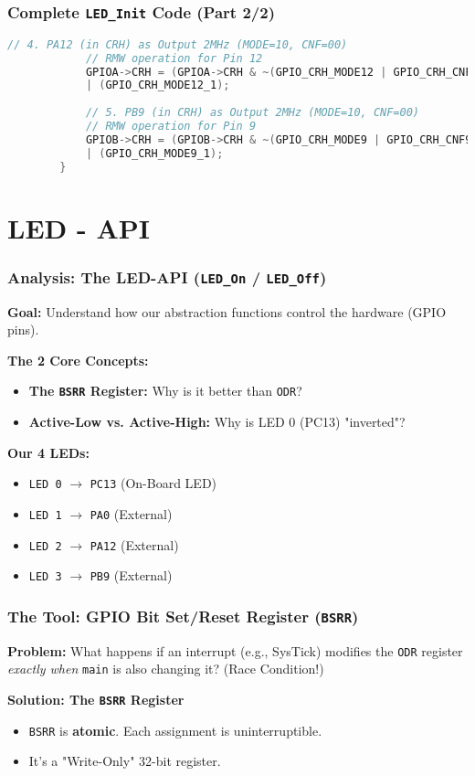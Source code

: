 \documentclass{beamer}
\begin{document}
	\begin{frame}[fragile]
		\frametitle{Complete \texttt{LED\_Init} Code (Part 2/2)}
		\begin{lstlisting}[language=C, style=mystyle, basicstyle=\scriptsize]
			// 4. PA12 (in CRH) as Output 2MHz (MODE=10, CNF=00)
			// RMW operation for Pin 12
			GPIOA->CRH = (GPIOA->CRH & ~(GPIO_CRH_MODE12 | GPIO_CRH_CNF12))
			| (GPIO_CRH_MODE12_1);
			
			// 5. PB9 (in CRH) as Output 2MHz (MODE=10, CNF=00)
			// RMW operation for Pin 9
			GPIOB->CRH = (GPIOB->CRH & ~(GPIO_CRH_MODE9 | GPIO_CRH_CNF9))
			| (GPIO_CRH_MODE9_1);
		}
	\end{lstlisting}
\end{frame}
\section{LED - API}
\begin{frame}
	\frametitle{Analysis: The LED-API (\texttt{LED\_On} / \texttt{LED\_Off})}
	\textbf{Goal:} Understand how our abstraction functions
	control the hardware (GPIO pins).
	
	\bigskip
	\textbf{The 2 Core Concepts:}
	\begin{itemize}
		\item \textbf{The \texttt{BSRR} Register:} Why is it better than \texttt{ODR}?
		\item \textbf{Active-Low vs. Active-High:} Why is LED 0 (PC13) "inverted"?
	\end{itemize}
	
	\bigskip
	\textbf{Our 4 LEDs:}
	\begin{itemize}
		\item \texttt{LED 0} $\rightarrow$ \texttt{PC13} (On-Board LED)
		\item \texttt{LED 1} $\rightarrow$ \texttt{PA0} (External)
		\item \texttt{LED 2} $\rightarrow$ \texttt{PA12} (External)
		\item \texttt{LED 3} $\rightarrow$ \texttt{PB9} (External)
	\end{itemize}
\end{frame}

\begin{frame}[fragile]
	\frametitle{The Tool: GPIO Bit Set/Reset Register (\texttt{BSRR})}
	\textbf{Problem:} What happens if an interrupt (e.g., SysTick)
	modifies the \texttt{ODR} register \textit{exactly when} \texttt{main}
	is also changing it? (Race Condition!)
	
	\medskip
	\textbf{Solution: The \texttt{BSRR} Register}
	\begin{itemize}
		\item \texttt{BSRR} is \textbf{atomic}. Each assignment is uninterruptible.
		\item It's a "Write-Only" 32-bit register.
	\end{itemize}
\end{frame}
\end{document}

